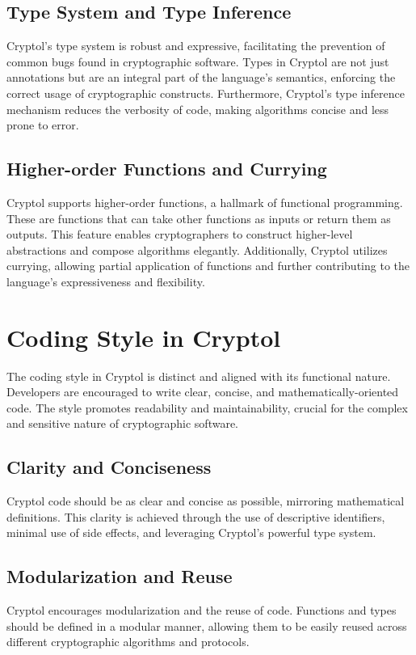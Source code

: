 \subsection*{Type System and Type Inference}
Cryptol's type system is robust and expressive, facilitating the prevention of common bugs found in cryptographic software. Types in Cryptol are not just annotations but are an integral part of the language's semantics, enforcing the correct usage of cryptographic constructs. Furthermore, Cryptol's type inference mechanism reduces the verbosity of code, making algorithms concise and less prone to error.

\subsection*{Higher-order Functions and Currying}
Cryptol supports higher-order functions, a hallmark of functional programming. These are functions that can take other functions as inputs or return them as outputs. This feature enables cryptographers to construct higher-level abstractions and compose algorithms elegantly. Additionally, Cryptol utilizes currying, allowing partial application of functions and further contributing to the language's expressiveness and flexibility.

\section*{Coding Style in Cryptol}
The coding style in Cryptol is distinct and aligned with its functional nature. Developers are encouraged to write clear, concise, and mathematically-oriented code. The style promotes readability and maintainability, crucial for the complex and sensitive nature of cryptographic software.

\subsection*{Clarity and Conciseness}
Cryptol code should be as clear and concise as possible, mirroring mathematical definitions. This clarity is achieved through the use of descriptive identifiers, minimal use of side effects, and leveraging Cryptol's powerful type system.

\subsection*{Modularization and Reuse}
Cryptol encourages modularization and the reuse of code. Functions and types should be defined in a modular manner, allowing them to be easily reused across different cryptographic algorithms and protocols.

